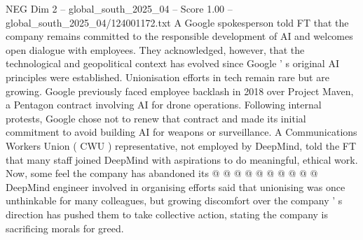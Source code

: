 \begin{textsample}{NEG Dim 2 – global\_south\_2025\_04 – Score 1.00 – global\_south\_2025\_04/124001172.txt}
A Google spokesperson told FT that the company remains committed to the responsible development of AI and welcomes open dialogue with employees.
They acknowledged, however, that the technological and geopolitical context has evolved since Google ' s original AI principles were established.
Unionisation efforts in tech remain rare but are growing.
Google previously faced employee backlash in 2018 over Project Maven, a Pentagon contract involving AI for drone operations.
Following internal protests, Google chose not to renew that contract and made its initial commitment to avoid building AI for weapons or surveillance.
A Communications Workers Union ( CWU ) representative, not employed by DeepMind, told the FT that many staff joined DeepMind with aspirations to do meaningful, ethical work.
Now, some feel the company has abandoned its @ @ @ @ @ @ @ @ @ @ DeepMind engineer involved in organising efforts said that unionising was once unthinkable for many colleagues, but growing discomfort over the company ' s direction has pushed them to take collective action, stating the company is sacrificing morals for greed.

\end{textsample}
